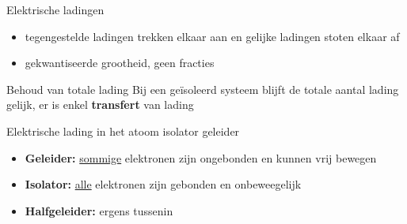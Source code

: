 \begin{theo}{Elektrische ladingen}
    \begin{itemize}
        \item tegengestelde ladingen trekken elkaar aan en gelijke ladingen stoten elkaar af
        \item gekwantiseerde grootheid, geen fracties
    \end{itemize}
\end{theo}

\begin{lem}{Behoud van totale lading}
    Bij een geïsoleerd systeem blijft de totale aantal lading gelijk, er is enkel \textbf{transfert} van lading
\end{lem}

\begin{app}{Elektrische lading in het atoom  isolator geleider}

    \begin{itemize}
        \item \textbf{Geleider:} \underline{sommige} elektronen zijn ongebonden en kunnen vrij bewegen
        \item \textbf{Isolator:} \underline{alle} elektronen zijn gebonden en onbeweegelijk
        \item \textbf{Halfgeleider:} ergens tussenin
    \end{itemize}

\end{app}

